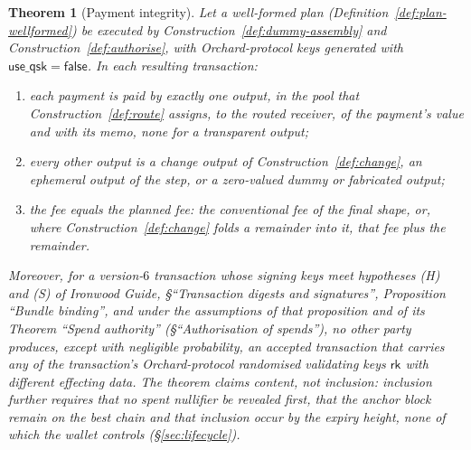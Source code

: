 \documentclass[11pt,a4paper]{article}
\newtheorem{theorem}{Theorem}[section]
\theoremstyle{definition}
\newcommand{\rk}{\mathsf{rk}}
\begin{document}
\begin{theorem}[Payment integrity]\label{thm:pipeline-integrity}
Let a well-formed plan (Definition~\ref{def:plan-wellformed}) be executed by
Construction~\ref{def:dummy-assembly} and Construction~\ref{def:authorise},
with Orchard-protocol keys generated with $\mathsf{use\_qsk} =
\mathsf{false}$. In each resulting transaction:
\begin{enumerate}[label=(\roman*)]
\item each payment is paid by exactly one output, in the pool that
  Construction~\ref{def:route} assigns, to the routed receiver, of the
  payment's value and with its memo, none for a transparent output;
\item every other output is a change output of
  Construction~\ref{def:change}, an ephemeral output of the step, or a
  zero-valued dummy or fabricated output;
\item the fee equals the planned fee: the conventional fee of the final
  shape, or, where Construction~\ref{def:change} folds a remainder into it,
  that fee plus the remainder.
\end{enumerate}
Moreover, for a version-$6$ transaction whose signing keys meet hypotheses
(H) and (S) of \emph{Ironwood Guide}, \S``Transaction digests and signatures'',
Proposition ``Bundle binding'', and under the assumptions of that proposition
and of its Theorem ``Spend authority'' (\S``Authorisation of spends''), no other
party produces, except with negligible probability, an accepted transaction that
carries any of the transaction's Orchard-protocol randomised validating keys
$\rk$ with different effecting data. The theorem claims content, not inclusion:
inclusion further requires that no spent nullifier be revealed first, that the
anchor block remain on the best chain and that inclusion occur by the expiry
height, none of which the wallet controls (\S\ref{sec:lifecycle}).
\end{theorem}
\end{document}
